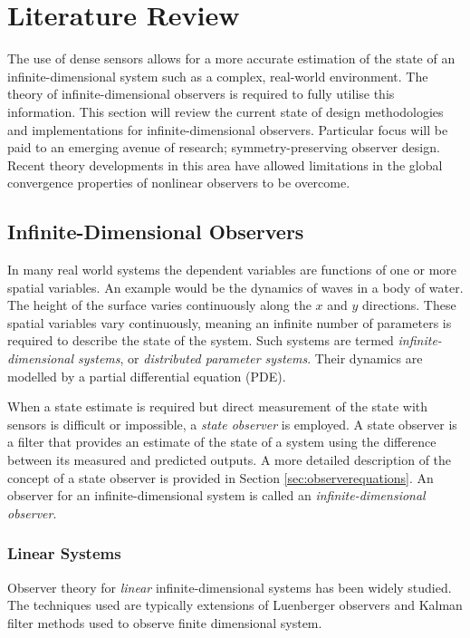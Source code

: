 \section{Literature Review} \label{sec:literature}
The use of dense sensors allows for a more accurate estimation of the state of an infinite-dimensional system such as a complex, real-world environment. The theory of infinite-dimensional observers is required to fully utilise this information. This section will review the current state of design methodologies and implementations for infinite-dimensional observers. Particular focus will be paid to an emerging avenue of research; symmetry-preserving observer design. Recent theory developments in this area have allowed limitations in the global convergence properties of nonlinear observers to be overcome.

\subsection{Infinite-Dimensional Observers}
In many real world systems the dependent variables are functions of one or more spatial variables. An example would be the dynamics of waves in a body of water. The height of the surface varies continuously along the $x$ and $y$ directions. These spatial variables vary continuously, meaning an infinite number of parameters is required to describe the state of the system. Such systems are termed \textit{infinite-dimensional systems}, or \textit{distributed parameter systems}. Their dynamics are modelled by a partial differential equation (PDE). 

When a state estimate is required but direct measurement of the state with sensors is difficult or impossible, a \textit{state observer} is employed. A state observer is a filter that provides an estimate of the state of a system using the difference between its measured and predicted outputs. A more detailed description of the concept of a state observer is provided in Section \ref{sec:observerequations}. An observer for an infinite-dimensional system is called an \textit{infinite-dimensional observer}.

\subsubsection{Linear Systems}
Observer theory for \textit{linear} infinite-dimensional systems has been widely studied. The techniques used are typically extensions of Luenberger observers and Kalman filter methods used to observe finite dimensional system.

